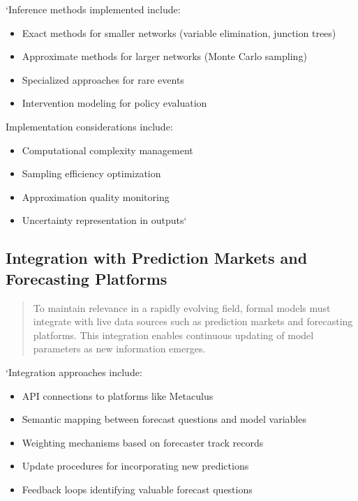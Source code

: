 \documentclass[
  11pt,
  letterpaper,
]{book}
\providecommand{\tightlist}{%
  \setlength{\itemsep}{0pt}\setlength{\parskip}{0pt}}
\begin{document}
`Inference methods implemented include:

\begin{itemize}
\tightlist
\item
  Exact methods for smaller networks (variable elimination, junction
  trees)
\item
  Approximate methods for larger networks (Monte Carlo sampling)
\item
  Specialized approaches for rare events
\item
  Intervention modeling for policy evaluation
\end{itemize}

Implementation considerations include:

\begin{itemize}
\tightlist
\item
  Computational complexity management
\item
  Sampling efficiency optimization
\item
  Approximation quality monitoring
\item
  Uncertainty representation in outputs`
\end{itemize}

\subsection{Integration with Prediction Markets and Forecasting
Platforms}\label{sec-prediction-markets}

\begin{quote}
To maintain relevance in a rapidly evolving field, formal models must
integrate with live data sources such as prediction markets and
forecasting platforms. This integration enables continuous updating of
model parameters as new information emerges.
\end{quote}

`Integration approaches include:

\begin{itemize}
\tightlist
\item
  API connections to platforms like Metaculus
\item
  Semantic mapping between forecast questions and model variables
\item
  Weighting mechanisms based on forecaster track records
\item
  Update procedures for incorporating new predictions
\item
  Feedback loops identifying valuable forecast questions
\end{itemize}
\end{document}
